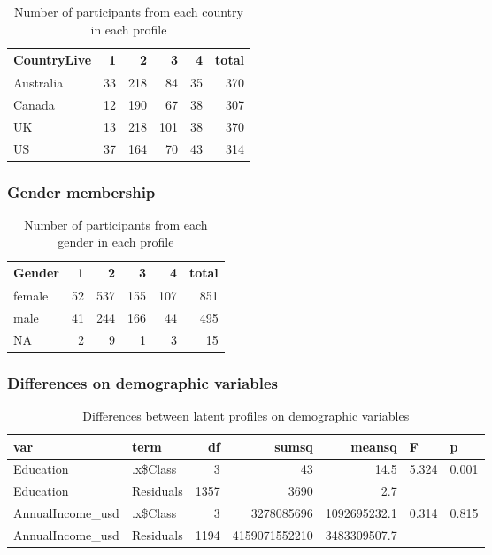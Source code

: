 \documentclass[]{article}
\begin{document}
\begin{table}[H]

\caption{\label{tab:unnamed-chunk-17}Number of participants from each country in each profile}
\centering
\fontsize{6}{8}\selectfont
\begin{tabular}[t]{lrrrrr}
\toprule
CountryLive & 1 & 2 & 3 & 4 & total\\
\midrule
Australia & 33 & 218 & 84 & 35 & 370\\
Canada & 12 & 190 & 67 & 38 & 307\\
UK & 13 & 218 & 101 & 38 & 370\\
US & 37 & 164 & 70 & 43 & 314\\
\bottomrule
\end{tabular}
\end{table}

\hypertarget{gender-membership-2}{%
\subsubsection{Gender membership}\label{gender-membership-2}}

\begin{table}[H]

\caption{\label{tab:unnamed-chunk-18}Number of participants from each gender in each profile}
\centering
\fontsize{6}{8}\selectfont
\begin{tabular}[t]{lrrrrr}
\toprule
Gender & 1 & 2 & 3 & 4 & total\\
\midrule
female & 52 & 537 & 155 & 107 & 851\\
male & 41 & 244 & 166 & 44 & 495\\
NA & 2 & 9 & 1 & 3 & 15\\
\bottomrule
\end{tabular}
\end{table}

\hypertarget{differences-on-demographic-variables-2}{%
\subsubsection{Differences on demographic
variables}\label{differences-on-demographic-variables-2}}

\begin{table}[H]

\caption{\label{tab:unnamed-chunk-19}Differences between latent profiles on demographic variables}
\centering
\fontsize{6}{8}\selectfont
\begin{tabular}[t]{llrrrll}
\toprule
var & term & df & sumsq & meansq & F & p\\
\midrule
Education & .x\$Class & 3 & 43 & 14.5 & 5.324 & 0.001\\
Education & Residuals & 1357 & 3690 & 2.7 &  & \\
AnnualIncome\_usd & .x\$Class & 3 & 3278085696 & 1092695232.1 & 0.314 & 0.815\\
AnnualIncome\_usd & Residuals & 1194 & 4159071552210 & 3483309507.7 &  & \\
\bottomrule
\end{tabular}
\end{table}
\end{document}
